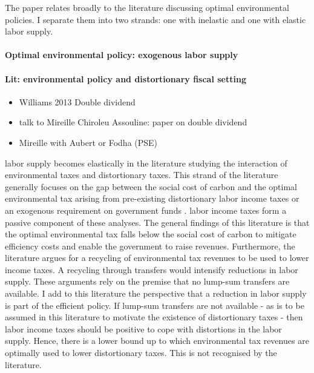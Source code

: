  The paper relates broadly to the literature discussing optimal environmental policies. I separate them into two strands: one with inelastic and one with elastic labor supply. 
  \paragraph{Optimal environmental policy: exogenous labor supply}
 
\paragraph{Lit: environmental policy and distortionary fiscal setting}
\tr{}
\begin{itemize}
	\item Williams 2013 Double dividend 
	\item talk to Mireille Chiroleu Assouline: paper on double dividend
	\item Mireille with Aubert or Fodha (PSE)
\end{itemize}
labor supply becomes elastically in the literature studying the interaction of environmental taxes and distortionary taxes.  This strand of the literature generally focuses on the gap between the social cost of carbon and the optimal environmental tax arising from pre-existing distortionary labor income taxes or an exogenous requirement on government funds \citep{Bovenberg1997EnvironmentalGrowth,  Kaplow2012OPTIMALTAXATION, Jacobs2019RedistributionCurves, Barrage2019OptimalPolicy}. labor income taxes form a passive component of these analyses. 
The general findings of this literature is that the optimal environmental tax falls below the social cost of carbon to mitigate efficiency costs and enable the government to raise revenues. 
Furthermore, the literature argues for a recycling of environmental tax revenues to be used to lower income taxes. A recycling through transfers would intensify reductions in labor supply. These arguments rely on the premise that no lump-sum transfers are available. I add to this literature the perspective that a reduction in labor supply is part of the efficient policy. If lump-sum transfers are not available - as is to be assumed in this literature to motivate the existence of distortionary taxes - then labor income taxes should be positive to cope with distortions in the labor supply. Hence, there is a lower bound up to which environmental tax revenues are optimally used to lower distortionary taxes. This is not recognised by the literature. 

